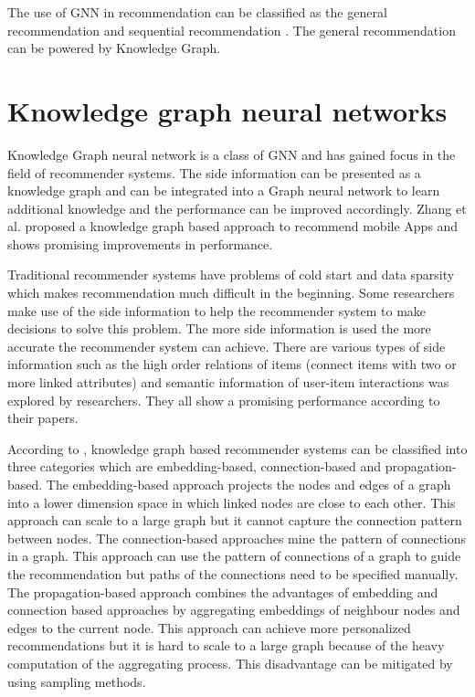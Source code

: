 \documentclass[11pt,twoside]{report}
\begin{document}
The use of GNN in recommendation can be classified as the general recommendation and sequential recommendation \cite{wu_graph_2020}. The general recommendation can be powered by Knowledge Graph.

\section{Knowledge graph neural networks}
Knowledge Graph neural network is a class of GNN and has gained focus in the field of recommender systems. The side information can be presented as a knowledge graph and can be integrated into a Graph neural network to learn additional knowledge and the performance can be improved accordingly. Zhang et al. \cite{zhang_knowledge_2020} proposed a knowledge graph based approach to recommend mobile Apps and shows promising improvements in performance.

Traditional recommender systems have problems of cold start and data sparsity \cite{mansur_review_nodate, wu_graph_2020, zhang_knowledge_2020} which makes recommendation much difficult in the beginning. Some researchers make use of the side information to help the recommender system to make decisions to solve this problem. The more side information is used the more accurate the recommender system can achieve. There are various types of side information such as the high order relations of items (connect items with two or more linked attributes) \cite{wang_kgat_2019} and semantic information of user-item interactions \cite{wang_knowledge_2019} was explored by researchers. They all show a promising performance according to their papers.

According to \cite{guo_survey_2020}, knowledge graph based recommender systems can be classified into three categories which are embedding-based, connection-based and propagation-based. The embedding-based approach projects the nodes and edges of a graph into a lower dimension space in which linked nodes are close to each other. This approach can scale to a large graph but it cannot capture the connection pattern between nodes. The connection-based approaches mine the pattern of connections in a graph. This approach can use the pattern of connections of a graph to guide the recommendation but paths of the connections need to be specified manually. The propagation-based approach combines the advantages of embedding and connection based approaches by aggregating embeddings of neighbour nodes and edges to the current node. This approach can achieve more personalized recommendations but it is hard to scale to a large graph because of the heavy computation of the aggregating process. This disadvantage can be mitigated by using sampling methods.
\end{document}
